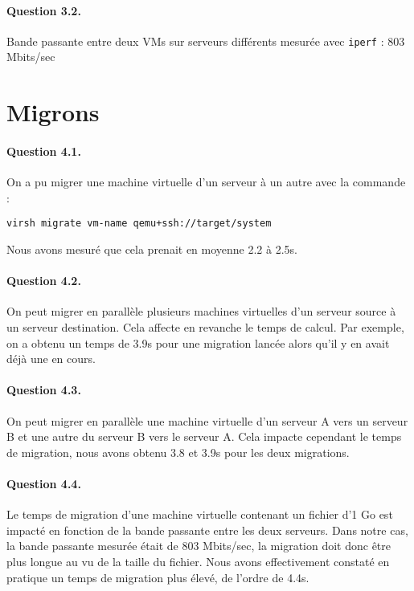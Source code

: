 \documentclass[a4paper]{article}
\begin{document}
\paragraph{Question 3.2.}
Bande passante entre deux VMs sur serveurs différents mesurée avec \texttt{iperf} : 803 Mbits/sec

\section{Migrons}

\paragraph{Question 4.1.}
On a pu migrer une machine virtuelle d'un serveur à un autre avec la commande :

\texttt{virsh migrate vm-name qemu+ssh://target/system}

\noindent Nous avons mesuré que cela prenait en moyenne 2.2 à 2.5s.

\paragraph{Question 4.2.}
On peut migrer en parallèle plusieurs machines virtuelles d'un serveur source à un serveur destination.
Cela affecte en revanche le temps de calcul.
Par exemple, on a obtenu un temps de 3.9s pour une migration lancée alors qu'il y en avait déjà une en cours.

\paragraph{Question 4.3.}
On peut migrer en parallèle une machine virtuelle d'un serveur A vers un serveur B et une autre du serveur B vers le serveur A.
Cela impacte cependant le temps de migration, nous avons obtenu 3.8 et 3.9s pour les deux migrations.

\paragraph{Question 4.4.}
Le temps de migration d'une machine virtuelle contenant un fichier d'1 Go est impacté en fonction de la bande passante entre les deux serveurs.
Dans notre cas, la bande passante mesurée était de 803 Mbits/sec, la migration doit donc être plus longue au vu de la taille du fichier.
Nous avons effectivement constaté en pratique un temps de migration plus élevé, de l'ordre de 4.4s.
\end{document}
